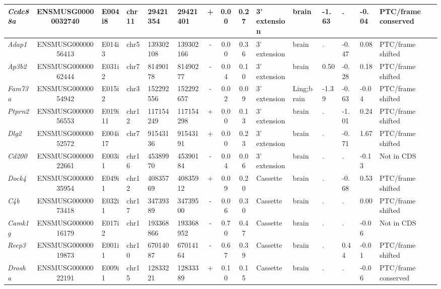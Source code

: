 \begin{landscape}
\begin{table}[htbp]
{\begin{tabular}{|l|c|l|l|l|l|c|c|c|l|l|l|l|l|l|}
		\textit{Ccdc88a} & ENSMUSG00000032740 & E004i8 & chr11 & 29421354 & 29421401 & +     & 0.00  & 0.27  & 3' extension & brain & -1.63 & .     & -0.04 & PTC/frame conserved \\ \hline
		\textit{Adap1} & ENSMUSG00000056413 & E014i3 & chr5  & 139302108 & 139302166 & -     & 0.00  & 0.36  & 3' extension & brain & .     & -0.47 & 0.08  & PTC/frame shifted \\ \hline
		\textit{Ap3b2} & ENSMUSG00000062444 & E031i2 & chr7  & 81490178 & 81490277 & -     & 0.04  & 0.10  & 3' extension & brain & 0.50  & -0.28 & 0.18  & PTC/frame shifted \\ \hline
		\textit{Fam73a} & ENSMUSG00000054942 & E015i2 & chr3  & 152292556 & 152292657 & -     & 0.02  & 0.09  & 3' extension & Ling;brain & -1.39 & -0.63 & -0.04 & PTC/frame shifted \\ \hline
		\textit{Ptprn2} & ENSMUSG00000056553 & E019i11 & chr12 & 117154249 & 117154298 & +     & 0.00  & 0.13  & 3' extension & brain & .     & -1.01 & 0.24  & PTC/frame shifted \\ \hline
		\textit{Dlg2} & ENSMUSG00000052572 & E004i17 & chr7  & 91543136 & 91543191 & +     & 0.00  & 0.23  & 3' extension & brain & .     & -0.71 & 1.67  & PTC/frame shifted \\ \hline
		\textit{Cd200} & ENSMUSG00000022661 & E003i1 & chr16 & 45389970 & 45390184 & -     & 0.04  & 0.06  & 3' extension & brain & .     & .     & -0.13 & Not in CDS \\ \hline
		\textit{Dock4} & ENSMUSG00000035954 & E049i1 & chr12 & 40835769 & 40835912 & +     & 0.09  & 0.20  & Cassette & brain & .     & -0.68 & 0.53  & PTC/frame shifted \\ \hline
		\textit{C4b} & ENSMUSG00000073418 & E032i1 & chr17 & 34739389 & 34739500 & -     & 0.06  & 0.30  & Cassette & brain & .     & .     & 0.00  & PTC/frame shifted \\ \hline
		\textit{Camk1g} & ENSMUSG00000016179 & E017i2 & chr1  & 193368866 & 193368952 & -     & 0.70  & 0.47  & Cassette & brain & .     & .     & -0.06 & Not in CDS  \\ \hline
		\textit{Reep3} & ENSMUSG00000019873 & E001i1 & chr10 & 67014087 & 67014164 & -     & 0.67  & 0.39  & Cassette & brain & .     & 0.44  & -0.01 & PTC/frame shifted \\ \hline
		\textit{Drosha} & ENSMUSG00000022191 & E009i1 & chr15 & 12833221 & 12833389 & +     & 0.10  & 0.15  & Cassette & brain & .     & .     & -0.06 & PTC/frame conserved \\ \hline

\end{tabular}}
\end{table}
\end{landscape}
